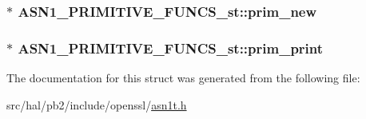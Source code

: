 \subsubsection[{\texorpdfstring{prim\+\_\+new}{prim_new}}]{$\ast$ A\+S\+N1\+\_\+\+P\+R\+I\+M\+I\+T\+I\+V\+E\+\_\+\+F\+U\+N\+C\+S\+\_\+st\+::prim\+\_\+new}\hypertarget{struct_a_s_n1___p_r_i_m_i_t_i_v_e___f_u_n_c_s__st_a0fe6cb24ad4850f35c72bdc080ad9c4a}{}\label{struct_a_s_n1___p_r_i_m_i_t_i_v_e___f_u_n_c_s__st_a0fe6cb24ad4850f35c72bdc080ad9c4a}
\subsubsection[{\texorpdfstring{prim\+\_\+print}{prim_print}}]{$\ast$ A\+S\+N1\+\_\+\+P\+R\+I\+M\+I\+T\+I\+V\+E\+\_\+\+F\+U\+N\+C\+S\+\_\+st\+::prim\+\_\+print}\hypertarget{struct_a_s_n1___p_r_i_m_i_t_i_v_e___f_u_n_c_s__st_a8fd7a2f06014a2bb7c4bd274407eb61d}{}\label{struct_a_s_n1___p_r_i_m_i_t_i_v_e___f_u_n_c_s__st_a8fd7a2f06014a2bb7c4bd274407eb61d}


The documentation for this struct was generated from the following file\+:\begin{DoxyCompactItemize}
\item 
src/hal/pb2/include/openssl/\hyperlink{asn1t_8h}{asn1t.\+h}\end{DoxyCompactItemize}
